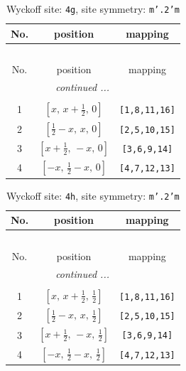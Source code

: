 \documentclass[fleqn,8pt]{jsarticle}
\begin{document}
\renewcommand{\arraystretch}{1.2}
\begin{longtable}{ccc}
\caption{Wyckoff site: {\tt 4g}, site symmetry: {\tt m'.2'm}}
 \\
 \hline \hline
No. & position & mapping \\ \hline \endfirsthead

\multicolumn{2}{l}{\tablename\ \thetable{}} \\
 \hline \hline
No. & position & mapping \\ \hline \endhead

 \hline \hline
\multicolumn{2}{r}{\footnotesize\it continued ...} \\ \endfoot

 \hline \hline
\multicolumn{2}{r}{} \\ \endlastfoot

1 & $\left[ x,\, x + \frac{1}{2},\, 0 \right]$ & {\tt [1,8,11,16]} \\ \hline
2 & $\left[ \frac{1}{2} - x,\, x,\, 0 \right]$ & {\tt [2,5,10,15]} \\ \hline
3 & $\left[ x + \frac{1}{2},\, - x,\, 0 \right]$ & {\tt [3,6,9,14]} \\ \hline
4 & $\left[ - x,\, \frac{1}{2} - x,\, 0 \right]$ & {\tt [4,7,12,13]} \\
\end{longtable}
\renewcommand{\arraystretch}{1.2}
\begin{longtable}{ccc}
\caption{Wyckoff site: {\tt 4h}, site symmetry: {\tt m'.2'm}}
 \\
 \hline \hline
No. & position & mapping \\ \hline \endfirsthead

\multicolumn{2}{l}{\tablename\ \thetable{}} \\
 \hline \hline
No. & position & mapping \\ \hline \endhead

 \hline \hline
\multicolumn{2}{r}{\footnotesize\it continued ...} \\ \endfoot

 \hline \hline
\multicolumn{2}{r}{} \\ \endlastfoot

1 & $\left[ x,\, x + \frac{1}{2},\, \frac{1}{2} \right]$ & {\tt [1,8,11,16]} \\ \hline
2 & $\left[ \frac{1}{2} - x,\, x,\, \frac{1}{2} \right]$ & {\tt [2,5,10,15]} \\ \hline
3 & $\left[ x + \frac{1}{2},\, - x,\, \frac{1}{2} \right]$ & {\tt [3,6,9,14]} \\ \hline
4 & $\left[ - x,\, \frac{1}{2} - x,\, \frac{1}{2} \right]$ & {\tt [4,7,12,13]} \\
\end{longtable}
\end{document}

